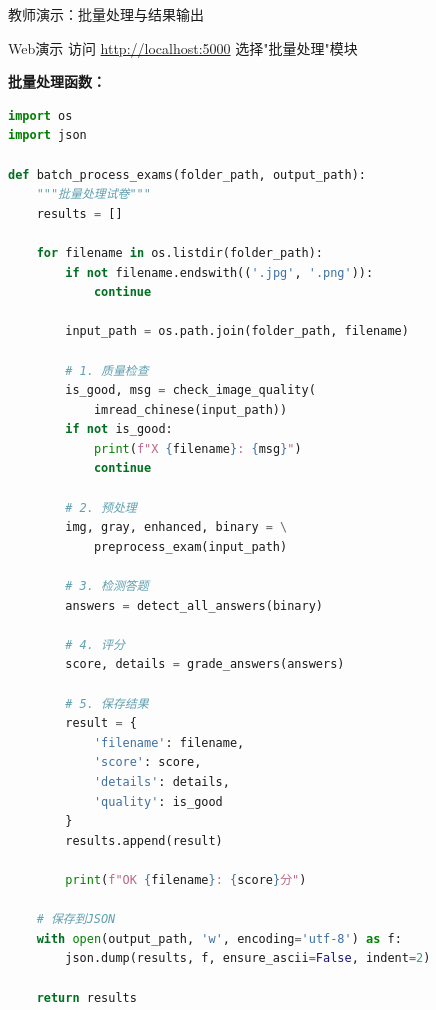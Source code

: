 \begin{frame}[fragile]{教师演示：批量处理与结果输出}
	\begin{alertblock}{Web演示}
		访问 \url{http://localhost:5000} 选择"批量处理"模块
	\end{alertblock}

	\textbf{批量处理函数：}
	\begin{lstlisting}[language=Python, basicstyle=\ttfamily\tiny]
import os
import json

def batch_process_exams(folder_path, output_path):
    """批量处理试卷"""
    results = []

    for filename in os.listdir(folder_path):
        if not filename.endswith(('.jpg', '.png')):
            continue

        input_path = os.path.join(folder_path, filename)

        # 1. 质量检查
        is_good, msg = check_image_quality(
            imread_chinese(input_path))
        if not is_good:
            print(f"X {filename}: {msg}")
            continue

        # 2. 预处理
        img, gray, enhanced, binary = \
            preprocess_exam(input_path)

        # 3. 检测答题
        answers = detect_all_answers(binary)

        # 4. 评分
        score, details = grade_answers(answers)

        # 5. 保存结果
        result = {
            'filename': filename,
            'score': score,
            'details': details,
            'quality': is_good
        }
        results.append(result)

        print(f"OK {filename}: {score}分")

    # 保存到JSON
    with open(output_path, 'w', encoding='utf-8') as f:
        json.dump(results, f, ensure_ascii=False, indent=2)

    return results
	\end{lstlisting}
\end{frame}
